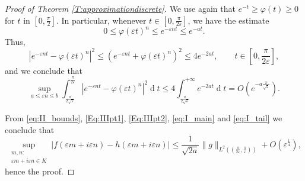 \documentclass[10pt,a4paper]{amsart}
\begin{document}
\begin{proof}[Proof of Theorem \ref{T:approximationdiscrete}]
    We use again that 
    \(
    e^{-t}\geqslant \varphi(t)\geqslant 0
    \)
    for $t$ in $[0,\frac\pi2]$.  
    In particular, whenever $t\in[0,\frac{\pi}{2\varepsilon}]$, %
    we have the estimate %
    \[
    0\leqslant \varphi(\varepsilon t)^n
    \leqslant e^{-\varepsilon nt}
    \leqslant e^{-at}.
    \]
    Thus,
    \[
    |
    e^{-\varepsilon nt}
    -
    \varphi(\varepsilon t)^n
    |^2
    \leqslant
    (e^{-\varepsilon nt}
    +
    \varphi(\varepsilon t)^n)^2
    \leqslant
    4e^{-2at},\qquad t\in[0,\frac{\pi}{2\varepsilon}],
    \]
    and we conclude that
    \begin{equation}\label{eq:I_tail}
    \sup_{a\leqslant \varepsilon n\leqslant b}\int_{\frac{\pi}{2\sqrt\varepsilon}}^{\frac{\pi}{2\varepsilon}}
    |e^{-\varepsilon nt}
    -\varphi(\varepsilon t)^n
    |^2
    \operatorname{d}\!t
    \leqslant
    4\int_{\frac{\pi}{2\sqrt\varepsilon}}^{+\infty}e^{-2at}\operatorname{d}\!t =O(e^{-a\frac{\pi}{\sqrt\varepsilon}}).
    \end{equation}
    
    From \eqref{eq:II_bounds}, \eqref{Eq:IIIpt1}, \eqref{Eq:IIIpt2}, \eqref{eq:I_main} and \eqref{eq:I_tail} we conclude that
    \[
    \sup_{\substack{m,n:\\
    \varepsilon m+i\varepsilon n\in K}}|f(\varepsilon m+i\varepsilon n)-h(\varepsilon m+i\varepsilon n)|\leqslant \frac{1}{\sqrt{2a}}\|g\|_{L^2((\frac{\pi}{2\varepsilon},\frac{\pi}{\varepsilon}))}+O(\varepsilon^{\frac{1}{4}}),
    \]
    hence the proof.
    \end{proof}
\end{document}
